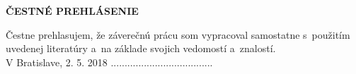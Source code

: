 \newpage
\thispagestyle{plain}
\vspace*{19cm}
\begin{large}
\noindent
\textbf{ČESTNÉ PREHLÁSENIE} \\
\end{large}
\noindent
Čestne prehlasujem, že záverečnú prácu som vypracoval samostatne s~použitím uvedenej literatúry a~na základe svojich
vedomostí a~znalostí.
\vspace*{1.5cm}\\
V Bratislave, 2. 5. 2018 \hspace*{6.5cm}.....................................\\
\hspace*{11.5cm} \Author
\afterpage{\blankpage}

